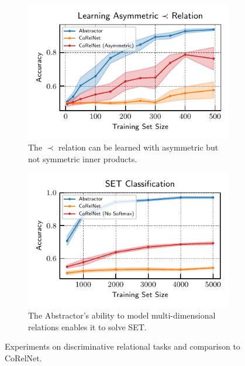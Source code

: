 \begin{figure}[t]
    \centering
    \begin{subfigure}[t]{0.45\textwidth}
        \centering
        \includegraphics[width=\textwidth]{figures/experiments/pairwise_order_learning_curves.pdf}
        \caption{The $\prec$ relation can be learned with asymmetric but not symmetric inner products.}\label{fig:exp_order_relation}
    \end{subfigure} 
    \hskip10pt
    \begin{subfigure}[t]{0.45\textwidth}
        \centering
        \includegraphics[width=\textwidth]{figures/experiments/set_classification.pdf}
        \caption{The Abstractor's ability to model multi-dimensional relations enables it to solve SET.}\label{fig:exp_set_classification}
    \end{subfigure}
    \caption{Experiments on discriminative relational tasks and comparison to CoRelNet.}
\end{figure}
